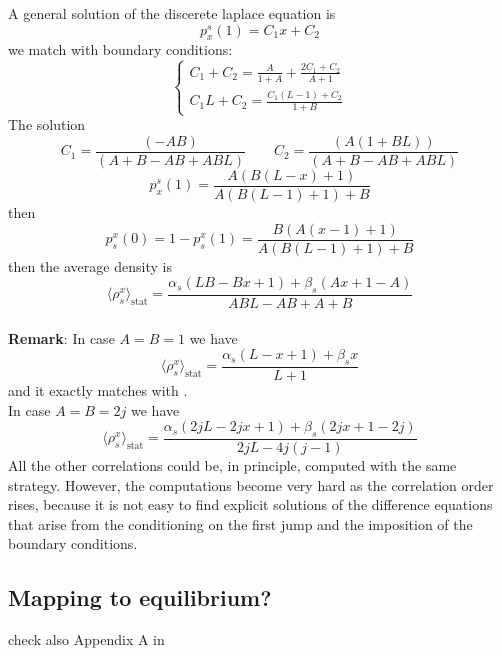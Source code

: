 \documentclass[11pt]{article}
\numberwithin{equation}{subsection}
\begin{document}
A general solution of the discerete laplace equation is
\begin{equation}
	p_{x}^{s}(1)=C_{1}x+C_{2}
\end{equation}
we match with boundary conditions:
\begin{equation}
	\begin{cases}
	C_{1}+C_{2}=\frac{A}{1+A}+\frac{2C_{1}+C_{2}}{A+1}\\
	C_{1}L+C_{2}=\frac{C_{1}(L-1)+C_{2}}{1+B}
	\end{cases}
\end{equation}
The solution
\begin{equation}
	C_{1}=\frac{(-A B)}{(A + B - A B + A B L)}\qquad C_{2}=\frac{(A (1 + B L))}{(A + B - A B + A B L)}
\end{equation}
\begin{equation}
	p_{x}^{s}(1)=\frac{A (B (L-x)+1)}{A (B (L-1)+1)+B}
\end{equation}
then 
\begin{equation}
	p^{x}_{s}(0)=1-p^{x}_{s}(1)=\frac{B (A (x-1)+1)}{A (B (L-1)+1)+B}
\end{equation}
then the average density is 
\begin{equation}
\langle\rho_{s}^{x}\rangle_{\text{stat}}=\frac{\alpha_{s}(LB-Bx+1)+\beta_{s}(Ax+1-A)}{ABL-AB+A+B}
\end{equation}
\newline \\
\textbf{Remark}: In case $A=B=1$ we have 
	\begin{equation}
\langle\rho_{s}^{x}\rangle_{\text{stat}}=\frac{\alpha_{s}(L-x+1)+\beta_{s}x}{L+1}
	\end{equation}
and it exactly matches with \cite{vanicat2017exact}. \\
In case $A=B=2j$ we have 
\begin{equation}
	\langle\rho_{s}^{x}\rangle_{\text{stat}}=\frac{\alpha_{s}(2jL-2jx+1)+\beta_{s}(2jx+1-2j)}{2jL-4j(j-1)}
\end{equation}
All the other correlations could be, in principle, computed with the same strategy. However, the computations become very hard as the correlation order rises, because it is not easy to find explicit solutions of the difference equations that arise from the conditioning on the first jump and the imposition of the boundary conditions. 
\subsection{Mapping to equilibrium?}
{\color{red}
check also Appendix A in
\cite{Alcaraz:1992zc} }
\end{document}
